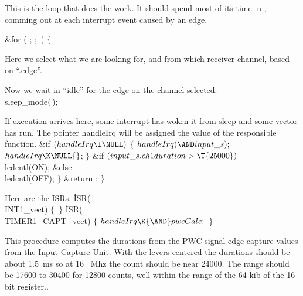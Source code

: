 This is the loop that does the work. It should spend most of its time in
, comming out at each interrupt event caused by an edge.

\Y\B\&{for} ( ;  ; \,) $\{{}$\Y\par
\fi

Here we select what we are looking for, and from which receiver channel,
based on ``.edge''.
\Y\B\par
\fi

Now we wait in ``idle'' for the edge on the channel selected.
\Y\B\\{sleep\_mode}(\,);\par
\fi

If execution arrives here, some interrupt has woken it from sleep and some
vector has run. The pointer handleIrq will be assigned the value of the
responsible function.
\Y\B\&{if} ${}(\\{handleIrq}\I\NULL){}$\5
${}\{{}$\1\7
${}\\{handleIrq}({\AND}\\{input\_s});{}$\6
${}\\{handleIrq}\K\NULL{}$;\6
\4${}\}{}$\2\6
\&{if} ${}(\\{input\_s}.\\{ch1duration}>\T{25000}){}$\1\5
\\{ledcntl}(\.{ON});\2\6
\&{else}\1\5
\\{ledcntl}(\.{OFF});\2\7
$\}{}$\7
\&{return} ;\7
$\}{}$\par
\fi

Here are the ISRs.
\Y\B\.{ISR}(\\{INT1\_vect})\1\1\2\2\6
${}\{{}$\7
\,${}\}{}$\7
\.{ISR}(\\{TIMER1\_CAPT\_vect})\1\1\2\2\6
${}\{{}$\1\7
${}\\{handleIrq}\K{\AND}\\{pwcCalc};{}$\6
\4${}\}{}$\2\par
\fi

This procedure computes the durations from the PWC signal edge capture values
from the Input Capture Unit.
With the levers centered the durations should be about 1.5~ms so at 16~ Mhz
the count should be near 24000.
The range should be 17600 to 30400 for 12800 counts, well within the range
of the 64 kib of the 16 bit register..


